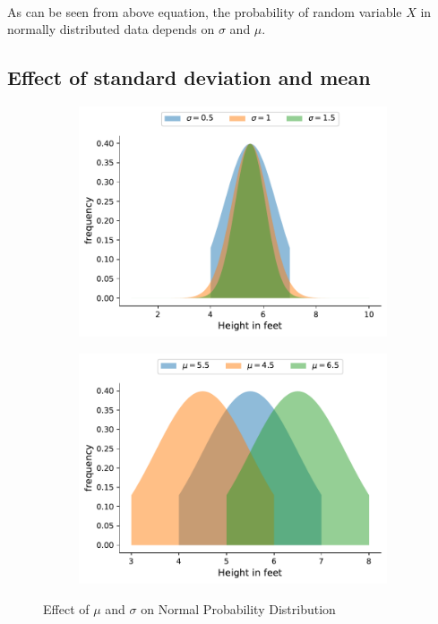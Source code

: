 \documentclass[twoside,12pt]{report}  %
\begin{document}
\noindent
\\
As can be seen from above equation, the probability of random variable $X$ in normally distributed data depends on $\sigma$ and $\mu$.

\subsection{Effect of standard deviation and mean}

\begin{figure}[H]
	\centering
	\begin{subfigure}[b]{0.3\textwidth}
		\includegraphics[width=\textwidth]{./images/normal_example_d.pdf}
	\end{subfigure}
	\begin{subfigure}[b]{0.3\textwidth}
		\includegraphics[width=\textwidth]{./images/normal_example_m.pdf}
	\end{subfigure}
	\caption{Effect of $\mu$ and $\sigma$ on Normal Probability Distribution}
	\label{figure_normal_example_d_mu}
\end{figure}
\end{document}
